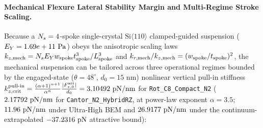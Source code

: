\paragraph{Mechanical Flexure Lateral Stability Margin and Multi-Regime Stroke Scaling.}
Because a $N_s = 4{}$-spoke single-crystal $\text{Si}\langle 110\rangle$ clamped-guided suspension ($E_Y = 1.69e+11{}\text{ Pa}$) obeys the anisotropic scaling laws $k_{z,\rm mech} = N_s E_Y w_{\rm spoke} t_{\rm spoke}^3 / L_{\rm spoke}^3$ and $k_{r,\rm mech} / k_{z,\rm mech} = (w_{\rm spoke} / t_{\rm spoke})^2$, the mechanical suspension can be tailored across three operational regimes bounded by the engaged-state ($\theta=48^\circ$, $d_0=15\text{ nm}$) nonlinear vertical pull-in stiffness $k_{z,\rm crit}^{\rm pull\text{-}in} = \frac{(\alpha+1)^{\alpha+1}}{\alpha^\alpha}\frac{|F_{z,0}^{\rm att}|}{d_0} = 3.10492{}\text{ pN/nm}$ for \texttt{Rot\_C8\_Compact\_N2} ($2.17792{}\text{ pN/nm}$ for \texttt{Cantor\_N2\_HybridRZ}, at power-law exponent $\alpha=3.5$; $11.96{}\text{ pN/nm}$ under Ultra-High BEM and $26.9177{}\text{ pN/nm}$ under the continuum-extrapolated $-37.2316{}\text{ pN}$ attractive bound):
